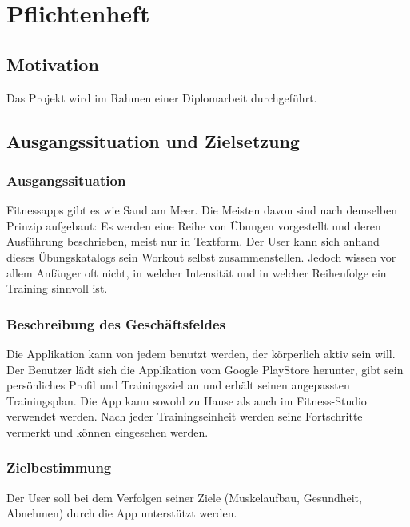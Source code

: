 \documentclass[FIPLY_base.tex]{subfiles}
\begin{document}
	\section{Pflichtenheft}
	
	\subsection{Motivation}
	Das Projekt wird im Rahmen einer Diplomarbeit durchgeführt.
	\subsection{Ausgangssituation und Zielsetzung}
	\subsubsection{Ausgangssituation}
	Fitnessapps gibt es wie Sand am Meer. Die Meisten davon sind nach demselben Prinzip aufgebaut: Es werden eine Reihe von Übungen vorgestellt und deren Ausführung beschrieben, meist nur in Textform. Der User kann sich anhand dieses Übungskatalogs sein Workout selbst zusammenstellen. Jedoch wissen vor allem Anfänger oft nicht, in welcher Intensität und in welcher Reihenfolge ein Training sinnvoll ist. 
	\subsubsection{Beschreibung des Geschäftsfeldes}
	Die Applikation kann von jedem benutzt werden, der körperlich aktiv sein will. Der Benutzer lädt sich die Applikation vom Google PlayStore herunter, gibt sein persönliches Profil und Trainingsziel an und erhält seinen angepassten Trainingsplan. Die App kann sowohl zu Hause als auch im Fitness-Studio verwendet werden. Nach jeder Trainingseinheit werden seine Fortschritte vermerkt und können eingesehen werden.
	
	\subsubsection{Zielbestimmung}
	Der User soll bei dem Verfolgen seiner Ziele (Muskelaufbau, Gesundheit, Abnehmen) durch die App unterstützt werden.
	
\end{document}
